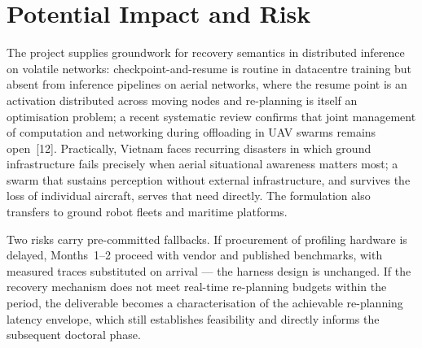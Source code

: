 \documentclass[11pt,a4paper]{article}
\begin{document}
\section{Potential Impact and Risk}

The project supplies groundwork for recovery semantics in distributed inference on volatile networks: checkpoint-and-resume is routine in datacentre training but absent from inference pipelines on aerial networks, where the resume point is an activation distributed across moving nodes and re-planning is itself an optimisation problem; a recent systematic review confirms that joint management of computation and networking during offloading in UAV swarms remains open~[12]. Practically, Vietnam faces recurring disasters in which ground infrastructure fails precisely when aerial situational awareness matters most; a swarm that sustains perception without external infrastructure, and survives the loss of individual aircraft, serves that need directly. The formulation also transfers to ground robot fleets and maritime platforms.

Two risks carry pre-committed fallbacks. If procurement of profiling hardware is delayed, Months~1--2 proceed with vendor and published benchmarks, with measured traces substituted on arrival --- the harness design is unchanged. If the recovery mechanism does not meet real-time re-planning budgets within the period, the deliverable becomes a characterisation of the achievable re-planning latency envelope, which still establishes feasibility and directly informs the subsequent doctoral phase.
\end{document}
